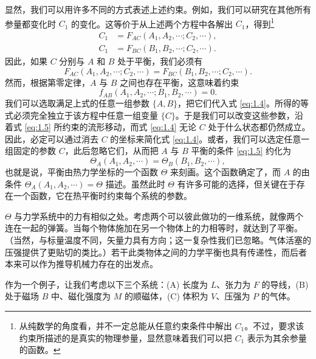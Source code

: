 显然，我们可以用许多不同的方式表述上述约束。例如，我们可以研究在其他所有参量都变化时 $C_1$ 的变化。这等价于从上述两个方程中各解出 $C_1$，得到\footnote{从纯数学的角度看，并不一定总能从任意约束条件中解出 $C_1$。不过，要求该约束所描述的是真实的物理参量，显然意味着我们可以把 $C_1$ 表示为其余参量的函数。}
\begin{equation}
\begin{aligned}
C_1 &= F_{AC}(A_1,A_2,\cdots;C_2,\cdots),\\
C_1 &= F_{BC}(B_1,B_2,\cdots;C_2,\cdots).
\end{aligned}
\label{eq:1.3}
\end{equation}
因此，如果 $C$ 分别与 $A$ 和 $B$ 处于平衡，我们必须有
\begin{equation}
F_{AC}(A_1,A_2,\cdots;C_2,\cdots)=F_{BC}(B_1,B_2,\cdots;C_2,\cdots).
\label{eq:1.4}
\end{equation}
然而，根据第零定律，$A$ 与 $B$ 之间也存在平衡，这意味着约束
\begin{equation}
f_{AB}(A_1,A_2,\cdots;B_1,B_2,\cdots)=0.
\label{eq:1.5}
\end{equation}
我们可以选取满足上式的任意一组参数 $\{A,B\}$，把它们代入式 \eqref{eq:1.4}。所得的等式必须完全独立于该方程中任意一组变量 $\{C\}$。于是我们可以改变这些参数，沿着式 \eqref{eq:1.5} 所约束的流形移动，而式 \eqref{eq:1.4} 无论 $C$ 处于什么状态都仍然成立。因此，必定可以通过消去 $C$ 的坐标来简化式 \eqref{eq:1.4}。或者，我们可以选定任意一组固定的参数 $C$，此后忽略它们，从而把 $A$ 与 $B$ 平衡的条件 \eqref{eq:1.5} 约化为
\begin{equation}
\Theta_A(A_1,A_2,\cdots)=\Theta_B(B_1,B_2,\cdots),
\label{eq:1.6}
\end{equation}
也就是说，平衡由热力学坐标的一个函数 $\Theta$ 来刻画。这个函数确定了，而 $A$ 的由条件 $\Theta_A(A_1,A_2,\cdots)=\Theta$ 描述。虽然此时 $\Theta$ 有许多可能的选择，但关键在于存在一个函数，它在热平衡时约束每个系统的参数。

$\Theta$ 与力学系统中的力有相似之处。考虑两个可以彼此做功的一维系统，就像两个连在一起的弹簧。当每个物体施加在另一个物体上的力相等时，就达到了平衡。（当然，与标量温度不同，矢量力具有方向；这一复杂性我们已忽略。气体活塞的压强提供了更贴切的类比。）若干此类物体之间的力学平衡也具有传递性，而后者本来可以作为推导机械力存在的出发点。


作为一个例子，让我们考虑以下三个系统：(A) 长度为 $L$、张力为 $F$ 的导线，(B) 处于磁场 $B$ 中、磁化强度为 $M$ 的顺磁体，(C) 体积为 $V$、压强为 $P$ 的气体。

